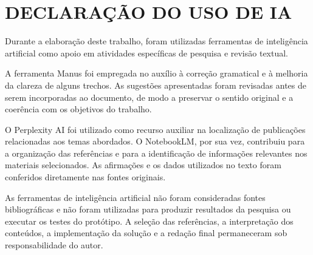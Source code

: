 \chapter{DECLARAÇÃO DO USO DE IA}

Durante a elaboração deste trabalho, foram utilizadas ferramentas de inteligência artificial como apoio em atividades específicas de pesquisa e revisão textual. 

A ferramenta Manus foi empregada no auxílio à correção gramatical e à melhoria da clareza de alguns trechos. As sugestões apresentadas foram revisadas antes de serem incorporadas ao documento, de modo a preservar o sentido original e a coerência com os objetivos do trabalho.

O Perplexity AI foi utilizado como recurso auxiliar na localização de publicações relacionadas aos temas abordados. O NotebookLM, por sua vez, contribuiu para a organização das referências e para a identificação de informações relevantes nos materiais selecionados. As afirmações e os dados utilizados no texto foram conferidos diretamente nas fontes originais.

As ferramentas de inteligência artificial não foram consideradas fontes bibliográficas e não foram utilizadas para produzir resultados da pesquisa ou executar os testes do protótipo. A seleção das referências, a interpretação dos conteúdos, a implementação da solução e a redação final permaneceram sob responsabilidade do autor.

